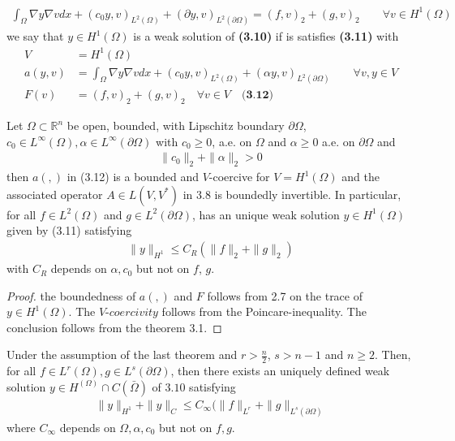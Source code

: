 \begin{align*}
	\int_\Omega \nabla y \nabla v dx + (c_0 y, v )_{L^2(\Omega)} + (\partial y, v )_{L^2(\partial \Omega)} = (f, v)_2 + (g, v)_2 \qquad \forall v \in H^1(\Omega)
\end{align*}
we say that $y \in H^1(\Omega)$ is a weak solution of \textbf{(3.10)} if is satisfies \textbf{(3.11)} with 
\begin{align*}
	V &= H^1(\Omega)\\
	a(y, v) &= \int_\Omega \nabla y \nabla v dx +  (c_0 y, v)_{L^2(\Omega)} + (\alpha y, v)_{L^2( \partial \Omega)}\qquad \forall v , y \in V\\
	F(v) &= (f, v)_2 + (g, v)_2\quad \forall v \in V \quad \textbf{(3.12)}
\end{align*}

\begin{theorem}
	Let $\Omega \subset \mathbb{R}^n$ be open, bounded, with Lipschitz boundary $\partial \Omega$, $c_0 \in L^\infty(\Omega), \alpha \in L^\infty(\partial \Omega)$ with $c_0 \geq 0$, a.e. on $\Omega$ and $\alpha \geq 0$ a.e. on $\partial \Omega$ and 
	\begin{align*}
		\|c_0\|_2 + \|\alpha\|_2 > 0
	\end{align*}
	then $a(, )$ in (3.12) is a bounded and $V$-coercive for $V = H^1(\Omega)$ and the associated operator $A \in L(V, V^*)$ in 3.8 is boundedly invertible. In particular, for all $f \in L^2(\Omega)$ and $g \in L^2(\partial \Omega)$, has an unique weak solution $y \in H^1(\Omega)$ given by (3.11) satisfying
		\begin{align*}
			\|y\|_{H^1} \le C_R (\|f\|_2 + \|g\|_2)
		\end{align*}
		with $C_R$ depends on $\alpha, c_0$ but not on $f$, $g$. 
\end{theorem}
\begin{proof}
	the boundedness of $a(, )$ and $F$ follows from 2.7 on the trace of $y \in H^1(\Omega)$. The $V$-$coercivity$ follows from the Poincare-inequality. The conclusion follows from the theorem 3.1.
\end{proof}

\begin{theorem}
	Under the assumption of the last theorem and $r > \frac{n}{2}$, $s > n -1$ and $n \geq 2$. Then, for all $f \in L^r(\Omega), g \in L^s(\partial \Omega)$, then there exists an uniquely defined weak solution $y \in H^(\Omega) \cap C(\bar{\Omega})$ of $3.10$ satisfying 
	\begin{align*}
		\|y\|_{H^1} + \|y\|_{C} \le C_\infty(\|f\|_{L^r} + \|g\|_{L^s(\partial \Omega)}
	\end{align*}
	where $C_\infty$ depends on $\Omega, \alpha, c_0$ but not on  $f, g$. 
\end{theorem}

